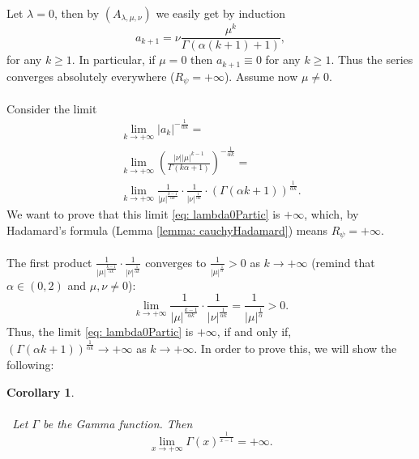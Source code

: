 \documentclass[a4paper,italian,11pt]{book}
\theoremstyle{plain}
\theoremstyle{remark}
\theoremstyle{plain}
\newtheorem{corollary}{Corollary}
\begin{document}
Let $\lambda = 0$, then by $(A_{\lambda, \mu, \nu})$ we easily get by induction
\begin{equation}
    a_{k+1} = \nu  \frac{\mu^k}{\Gamma(\alpha (k+1)+1)}, 
\end{equation}
\noindent
for any $k\ge 1$. In particular, if $\mu =0$ then $a_{k+1}\equiv 0$ for any $k\ge 1$. Thus the series converges absolutely everywhere ($R_\psi =+\infty$). Assume now $\mu \ne 0$.
\\
\\
Consider the limit
\begin{equation}
\label{eq: lambda0Partic}
\begin{gathered}
\lim_{k\to +\infty} |a_{k}|^{-\frac{1}{\alpha k}} =  \\
\lim_{k\to +\infty} \left( \frac{|\nu| |\mu|^{k-1}}{\Gamma(k\alpha +1)} \right)^{-\frac{1}{\alpha k}} = \\
\lim_{k\to +\infty}
\frac{1}{|\mu|^{\frac{k-1}{\alpha k}}} \cdot \frac{1}{|\nu|^{\frac{1}{\alpha k}}} \cdot \left( \Gamma(\alpha k +1) \right)^{\frac{1}{\alpha k}}.
\end{gathered}
\end{equation}
\noindent
We want to prove that this limit \eqref{eq: lambda0Partic} is $+\infty$, which, by Hadamard's formula (Lemma \ref{lemma: cauchyHadamard}) means $R_\psi = +\infty$.
\\
\\
The first product $\frac{1}{|\mu|^{\frac{k-1}{\alpha k}}} \cdot \frac{1}{|\nu|^{\frac{1}{\alpha k}}}$ converges to $\frac{1}{|\mu| ^ \frac{1}{\alpha}} > 0$ as $k\to +\infty$ (remind that $\alpha \in (0,2)$ and $\mu, \nu \ne 0$):
$$\lim_{k\to +\infty} \frac{1}{|\mu|^{\frac{k-1}{\alpha k}}} \cdot \frac{1}{|\nu|^{\frac{1}{\alpha k}} } = \frac{1}{|\mu| ^ \frac{1}{\alpha}} > 0.$$ 
Thus, the limit \eqref{eq: lambda0Partic} is $+\infty$, if and only if,  $\left( \Gamma(\alpha k+1) \right)^{\frac{1}{\alpha k}} \to +\infty$ as $k\to +\infty$. 
In order to prove this, we will show the following:

\begin{corollary}
\label{corollary: usefulFormulaForGamma}
\\\
\\\
Let $\Gamma$ be the Gamma function. Then 
\begin{equation}
    \label{eq: strangeCorollaryGammaFun}
    \lim_{x \to +\infty} \Gamma(x) ^{\frac{1}{x-1}} = +\infty.
\end{equation}
\end{corollary}
\\
\end{document}
